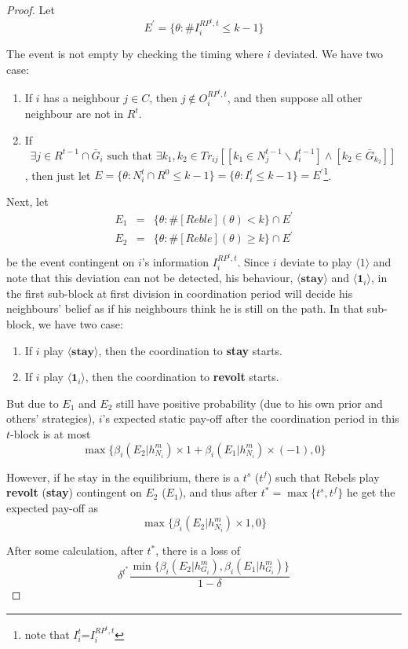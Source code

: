 \documentclass[12pt,letter]{article}
\theoremstyle{definition}
\theoremstyle{remark}
\theoremstyle{claim}
\begin{document}
\begin{proof}


Let
\[E^{'}=\{\theta:\#I^{RP^t,t}_i\leq k-1\}\]

The event is not empty by checking the timing where $i$ deviated. We have two case:
\begin{enumerate}
\item If $i$ has a neighbour $j\in C$, then $j\not\in O^{RP^t,t}_i$, and then suppose all other neighbour are not in $R^t$.
\item If \[\exists j\in R^{t-1}\cap \bar{G}_i \text{ such that } \exists k_1,k_2\in Tr_{ij}[[k_1\in N^{t-1}_j\backslash I^{t-1}_i] \wedge [k_2\in \bar{G}_{k_2}]]\], then just let $E=\{\theta: N^t_i\cap R^0\leq k-1\}=\{\theta: I^t_i\leq k-1\}=E^{'}$\footnote{note that $I^t_i$=$I^{RP^t,t}_i$}.
\end{enumerate}

Next, let 
\begin{eqnarray*}
E_1&=&\{\theta: \#[Reble](\theta)<k\}\cap E^{'}\\
E_2&=&\{\theta: \#[Reble](\theta)\geq k\}\cap E^{'}\\
\end{eqnarray*}
be the event contingent on $i$'s information $I^{RP^t,t}_i$. Since $i$ deviate to play $\langle 1 \rangle$ and note that this deviation can not be detected, his behaviour, $\langle \textbf{stay} \rangle$ and $\langle \mathbf{1}_i \rangle$, in the first sub-block at first division in coordination period will decide his neighbours' belief as if his neighbours think he is still on the path. In that sub-block, we have two case:
\begin{enumerate}
\item If $i$ play $\langle \textbf{stay} \rangle$, then the coordination to \textbf{stay} starts.
\item If $i$ play $\langle \mathbf{1}_i \rangle$, then the coordination to \textbf{revolt} starts.
\end{enumerate}

But due to $E_1$ and $E_2$ still have positive probability (due to his own prior and others' strategies), $i$'s expected static pay-off after the coordination period in this $t$-block is at most 
\[
{\max\{\beta_{i}(E_2|h^{m}_{N_i})\times 1+\beta_{i}(E_1|h^{m}_{N_i})\times (-1), 0\}}
\]

However, if he stay in the equilibrium, there is a $t^s$ ($t^f$) such that Rebels play \textbf{revolt} (\textbf{stay}) contingent on $E_2$ ($E_1$), and thus after $t^*=\max\{t^s,t^f\}$ he get the expected pay-off as
\[
{\max\{\beta_{i}(E_2|h^{m}_{N_i})\times 1, 0\}}
\]

After some calculation, after $t^*$, there is a loss of
\[\delta^{t^{*}}\frac{\min\{\beta_{i}(E_2|h^{m}_{G_i}),\beta_{i}(E_1|h^{m}_{G_i})\}}{1-\delta}\]
 






\end{proof}
\end{document}
